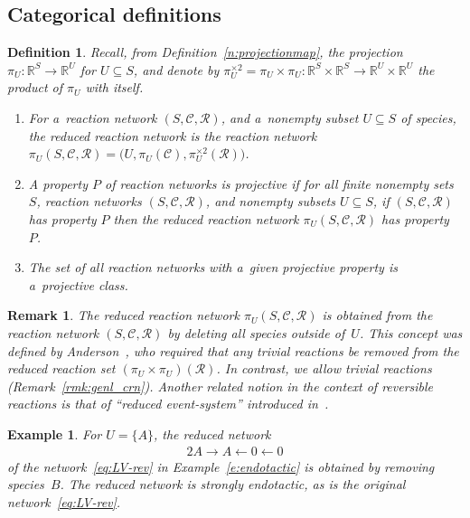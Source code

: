 \documentclass[pdftex]{sigma}
\newtheorem{Definition}[Theorem]{Definition}
\newtheorem{Example}[Theorem]{Example}
\newtheorem{Remark}[Theorem]{Remark}
\begin{document}
\subsection{Categorical def\/initions}
\label{ss:cd}
\begin{Definition}
\label{def:projective}
Recall, from Def\/inition~\ref{n:projectionmap}, the projection $\pi_U:\mathbb{R}^S\to\mathbb{R}^U$ for $U\subseteq S$,
and denote by $\pi_U^{\times2}=\pi_U\times\pi_U:\mathbb{R}^S\times\mathbb{R}^S\to\mathbb{R}^U\times\mathbb{R}^U$ the
product of $\pi_U$ with itself.
\begin{enumerate}\itemsep=0pt
\item For a~reaction network $(S,\mathcal C,\mathcal R)$, and a~nonempty subset $U\subseteq S$ of species, the
\emph{reduced reaction network} is the reaction network $\pi_U(S,\mathcal C,\mathcal R)=\big(U,\pi_U(\mathcal
C),\pi_U^{\times2}(\mathcal R)\big)$.
\item
\label{d:projective property}
A property $P$ of reaction networks is \emph{projective} if for all f\/inite nonempty sets $S$, reaction networks
$(S,\mathcal C,\mathcal R)$, and nonempty subsets $U\subseteq S$, if $(S,\mathcal C,\mathcal R)$ has property $P$ then
the reduced reaction network $\pi_U(S,\mathcal C,\mathcal R)$ has property~$P$.
\item The set of all reaction networks with a~given projective property is a~\emph{projective class}.
\end{enumerate}
\end{Definition}
\begin{Remark}
\label{r:reduced}
The reduced reaction network $\pi_U(S,\mathcal C,\mathcal R)$ is obtained from the reaction network $(S,\mathcal
C,\mathcal R)$ by deleting all species outside of~$U$.
This concept was def\/ined by Anderson~\cite[\S~3.2]{Anderson11}, who required that any trivial reactions be removed
from the reduced reaction set $(\pi_U\times\pi_U)(\mathcal R)$.
In contrast, we allow trivial reactions (Remark~\ref{rmk:genl_crn}).
Another related notion in the context of reversible reactions is that of ``reduced event-system'' introduced
in~\cite{adleman-2008}.
\end{Remark}
\begin{Example}
\label{e:reduced}
For $U=\{A\}$, the reduced network
\begin{gather*}
2A\to A\leftarrow0\leftarrow0
\end{gather*}
of the network~\eqref{eq:LV-rev} in Example~\ref{e:endotactic} is obtained by removing species~$B$.
The reduced network is strongly endotactic, as is the original network~\eqref{eq:LV-rev}.
\end{Example}
\end{document}
